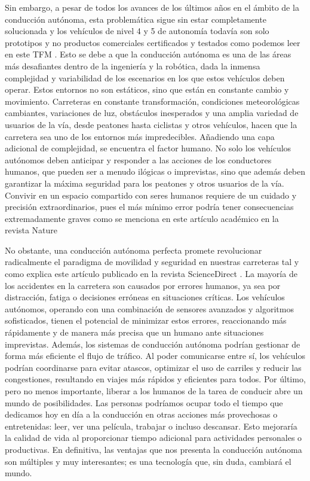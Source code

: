 \newpage

Sin embargo, a pesar de todos los avances de los últimos años en el ámbito de la conducción autónoma, esta problemática sigue sin estar completamente solucionada y los vehículos de nivel 4 y 5 de autonomía todavía son solo prototipos y no productos comerciales certificados y testados como podemos leer en este \ac{TFM} \cite{estado_del_arte_conducción_autónoma}. Esto se debe a que la conducción autónoma es una de las áreas más desafiantes dentro de la ingeniería y la robótica, dada la inmensa complejidad y variabilidad de los escenarios en los que estos vehículos deben operar. Estos entornos no son estáticos, sino que están en constante cambio y movimiento. Carreteras en constante transformación, condiciones meteorológicas cambiantes, variaciones de luz, obstáculos inesperados y una amplia variedad de usuarios de la vía, desde peatones hasta ciclistas y otros vehículos, hacen que la carretera sea uno de los entornos más impredecibles. Añadiendo una capa adicional de complejidad, se encuentra el factor humano. No solo los vehículos autónomos deben anticipar y responder a las acciones de los conductores humanos, que pueden ser a menudo ilógicas o imprevistas, sino que además deben garantizar la máxima seguridad para los peatones y otros usuarios de la vía. Convivir en un espacio compartido con seres humanos requiere de un cuidado y precisión extraordinarios, pues el más mínimo error podría tener consecuencias extremadamente graves como se menciona en este artículo académico en la revista Nature \cite{peligros_conducción_autónoma}

\bigskip

No obstante, una conducción autónoma perfecta promete revolucionar radicalmente el paradigma de movilidad y seguridad en nuestras carreteras tal y como explica este artículo publicado en la revista ScienceDirect \cite{la_revolución_de_la_conducción_autónoma}. La mayoría de los accidentes en la carretera son causados por errores humanos, ya sea por distracción, fatiga o decisiones erróneas en situaciones críticas. Los vehículos autónomos, operando con una combinación de sensores avanzados y algoritmos sofisticados, tienen el potencial de minimizar estos errores, reaccionando más rápidamente y de manera más precisa que un humano ante situaciones imprevistas. Además, los sistemas de conducción autónoma podrían gestionar de forma más eficiente el flujo de tráfico. Al poder comunicarse entre sí, los vehículos podrían coordinarse para evitar atascos, optimizar el uso de carriles y reducir las congestiones, resultando en viajes más rápidos y eficientes para todos. Por último, pero no menos importante, liberar a los humanos de la tarea de conducir abre un mundo de posibilidades. Las personas podríamos ocupar todo el tiempo que dedicamos hoy en día a la conducción en otras acciones más provechosas o entretenidas: leer, ver una película, trabajar o incluso descansar. Esto mejoraría la calidad de vida al proporcionar tiempo adicional para actividades personales o productivas. En definitiva, las ventajas que nos presenta la conducción autónoma son múltiples y muy interesantes; es una tecnología que, sin duda, cambiará el mundo.

